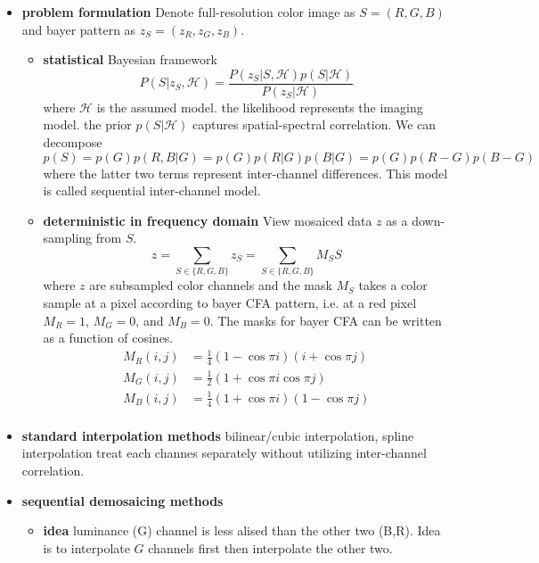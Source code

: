 \documentclass[11pt]{article}
\begin{document}
\begin{itemize}
    \item \textbf{problem formulation} Denote full-resolution color image as $S=(R,G,B)$ and bayer pattern as $z_S = (z_R, z_G, z_B)$. 
    \begin{itemize}
        \item \textbf{statistical} Bayesian framework
        \[
            P(S|z_S, \mathcal{H}) = 
            \frac{
                P(z_S | S, \mathcal{H}) p(S|\mathcal{H})
            }{
                P(z_S | \mathcal{H})
            }
        \]
        where $\mathcal{H}$ is the assumed model. the likelihood represents the imaging model. the prior $p(S|\mathcal{H})$ captures spatial-spectral correlation. We can decompose
        \[
            p(S) = p(G) p(R,B | G)
            = p(G) p(R|G) p(B|G)
            = p(G) p(R-G) p(B-G)
        \]
        where the latter two terms represent inter-channel differences. This model is called sequential inter-channel model.
        \item \textbf{deterministic in frequency domain} View mosaiced data $z$ as a down-sampling from $S$.
        \[
            z = \sum_{S\in\{R,G,B\}} z_S = \sum_{S\in \{R,G,B\}} M_S S
        \]
        where $z$ are subsampled color channels and the mask $M_S$ takes a color sample at a pixel according to bayer CFA pattern, i.e. at a red pixel $M_R = 1$, $M_G = 0$, and $M_B = 0$. The masks for bayer CFA can be written as a function of cosines.
        \begin{align*}
            M_R(i,j) &= \frac{1}{4} (1-\cos{\pi i}) (i+\cos{\pi j}) \\
            M_G(i,j) &= \frac{1}{2} (1 + \cos{\pi i} \cos{\pi j}) \\
            M_B(i, j) &= \frac{1}{4} (1 + \cos{\pi i})(1 - \cos{\pi j}) \\ 
        \end{align*}
    \end{itemize}
    \item \textbf{standard interpolation methods} bilinear/cubic interpolation, spline interpolation treat each channes separately without utilizing inter-channel correlation.
    \item \textbf{sequential demosaicing methods} 
    \begin{itemize}
        \item \textbf{idea} luminance (G) channel is less alised than the other two (B,R). Idea is to interpolate $G$ channels first then interpolate the other two.
    \end{itemize}
\end{itemize}
\end{document}

